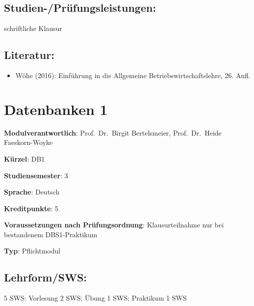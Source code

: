 \section*{Studien-/Prüfungsleistungen:}\label{studien-pruxfcfungsleistungen-5}

schriftliche Klausur

\section*{Literatur:}\label{literatur-4}

\begin{itemize}
\tightlist
\item
  Wöhe (2016): Einführung in die Allgemeine Betriebswirtschaftslehre,
  26. Aufl.
\end{itemize}

\chapter{Datenbanken 1}\label{datenbanken-1}

\begin{modulHead}
\textbf{Modulverantwortlich}: Prof.~Dr.~Birgit
Bertelsmeier, Prof.~Dr.~Heide
Faeskorn-Woyke
\end{modulHead}
\begin{modulHead}
\textbf{Kürzel}:
DB1
\end{modulHead}
\begin{modulHead}
\textbf{Studiensemester}:
3
\end{modulHead}
\begin{modulHead}
\textbf{Sprache}:
Deutsch
\end{modulHead}
\begin{modulHead}
\textbf{Kreditpunkte}:
5
\end{modulHead}
\begin{modulHead}
\textbf{Voraussetzungen nach
Prüfungsordnung}: Klausurteilnahme nur bei bestandenem
DBS1-Praktikum
\end{modulHead}
\begin{modulHead}
\textbf{Typ}:
Pflichtmodul
\end{modulHead}


\section*{Lehrform/SWS:}\label{lehrformsws-7}

5 SWS: Vorlesung 2 SWS; Übung 1 SWS; Praktikum 1 SWS

